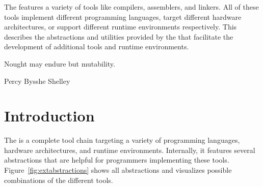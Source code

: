 





{The \ecs{} features a variety of tools like compilers, assemblers, and linkers.
All of these tools implement different programming languages, target different hardware architectures, or support different runtime environments respectively.
This \documentation{} describes the abstractions and utilities provided by the \ecs{} that facilitate the development of additional tools and runtime environments.}

\epigraph{Nought may endure but mutability.}{Percy Bysshe Shelley}

\section{Introduction}

The \ecs{} is a complete tool chain targeting a variety of programming languages, hardware architectures, and runtime environments.
Internally, it features several abstractions that are helpful for programmers implementing these tools.
Figure~\ref{fig:extabstractions} shows all abstractions and visualizes possible combinations of the different tools.

